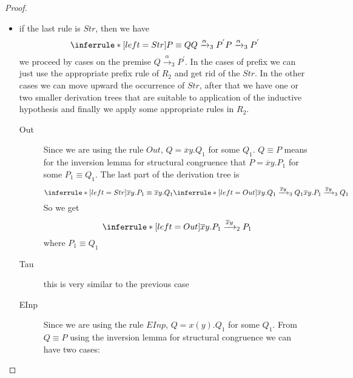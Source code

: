 \begin{theorem}
\begin{proof}
\begin{description}
\begin{description}
\begin{itemize}
		\[
		  \inferrule* [left=Par]{
		      P\xrightarrow{\alpha}_{3}P^{'}
		    \\
		      bn(\alpha)\cap fn(Q)=\emptyset
		  }{
		      P|Q\xrightarrow{\alpha}_{3}P^{'}|Q
		  }
		\]	
		now we apply the inductive hypothesis to $P\xrightarrow{\alpha}_{3}P^{'}$ and get $P\xrightarrow{\alpha}_{2}P^{''}$ for a $P^{''}$ such that $P^{'}\equiv P^{''}$. The proof we want is
		\[
		      \inferrule* [left=ParL]{
			  P\xrightarrow{\alpha}_{2}P^{''}
			\\
			  bn(\alpha)\cap fn(Q)=\emptyset
		      }{
			  P|Q\xrightarrow{\alpha}_{2}P|Q^{''}
		      }
		\]
		and $Q^{''}|P\equiv P|Q^{'}$
	      \item
		if the last rule is $Str$, then we have
		\[
		  \inferrule* [left=Str]{
		      P\equiv Q
		    \\
		      Q\xrightarrow{\alpha}_{3}P^{'}
		  }{
		    P\xrightarrow{\alpha}_{3}P^{'}
		  }
		\]
		we proceed by cases on the premise $Q\xrightarrow{\alpha}_{3}P^{'}$. In the cases of prefix we can just use the appropriate prefix rule of $R_{2}$ and get rid of the $Str$. In the other cases we can move upward the occurrence of $Str$, after that we have one or two smaller derivation trees that are suitable to application of the inductive hypothesis and finally we apply some appropriate rules in $R_{2}$.
		\begin{description}
		  \item[Out]
		    Since we are using the rule $Out$, $Q=\overline{x}y.Q_{1}$ for some $Q_{1}$. $Q\equiv P$ means for the inversion lemma for structural congruence that $P=\overline{x}y.P_{1}$ for some $P_{1}\equiv Q_{1}$. The last part of the derivation tree is 
		    \[
		      \inferrule* [left=Str]{
			  \overline{x}y.P_{1}\equiv \overline{x}y.Q_{1}
			\\
			  \inferrule* [left=Out]{
			  }{
			    \overline{x}y.Q_{1}\xrightarrow{\overline{x}y}_{3}Q_{1}
			  }
		      }{
			\overline{x}y.P_{1}\xrightarrow{\overline{x}y}_{3}Q_{1}
		      }
		    \]
		    So we get 
		    \[
		      \inferrule* [left=Out]{
		      }{
			\overline{x}y.P_{1}\xrightarrow{\overline{x}y}_{2}P_{1}
		      }
		    \]
		    where $P_{1}\equiv Q_{1}$
		  \item[Tau] this is very similar to the previous case
		  \item[EInp]
		    Since we are using the rule $EInp$, $Q=x(y).Q_{1}$ for some $Q_{1}$. From $Q\equiv P$ using the inversion lemma for structural congruence we can have two cases:
		    \begin{itemize}

\end{itemize}
\end{description}
\end{itemize}
\end{description}
\end{description}
\end{proof}
\end{theorem}
